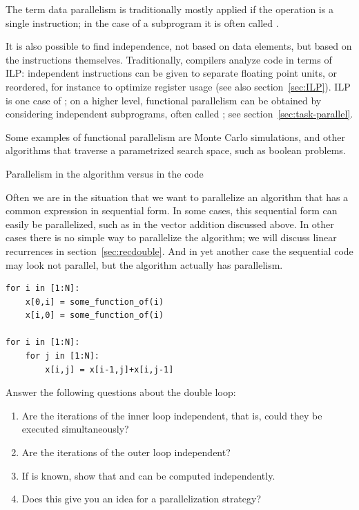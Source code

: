 The term data parallelism is traditionally mostly applied
if the operation is a single instruction; in the case of a subprogram
it is often called .

It is also possible to find independence, not based on data elements,
but based on the instructions themselves. Traditionally, compilers
analyze code in terms of \ac{ILP}: independent instructions can be given
to separate floating point units, or reordered, for instance to optimize
register usage (see also section~\ref{sec:ILP}).
\ac{ILP} is one case of ;
on a higher level, functional parallelism can be obtained
by considering independent subprograms, often called ;
see section~\ref{sec:task-parallel}.

Some examples of functional parallelism are Monte Carlo simulations,
and other algorithms that traverse a parametrized search space,
such as boolean  problems.

 {Parallelism in the algorithm versus in the code}

Often we are in the situation that we want to parallelize an algorithm
that has a common expression in sequential form. In some cases, this
sequential form can easily be parallelized, such as in the vector
addition discussed above. In other cases there is no simple way to
parallelize the algorithm; we will discuss linear recurrences in
section~\ref{sec:recdouble}. And in yet another case the sequential code may
look not parallel, but the algorithm actually has parallelism.

\begin{exercise}
\begin{verbatim}
for i in [1:N]:
    x[0,i] = some_function_of(i)
    x[i,0] = some_function_of(i)

for i in [1:N]:
    for j in [1:N]:
        x[i,j] = x[i-1,j]+x[i,j-1]
\end{verbatim}

Answer the following questions about the double  loop:
\begin{enumerate}
\item Are the iterations of the inner loop independent, that is, could
  they be executed simultaneously?
\item Are the iterations of the outer loop independent?
\item If  is known, show that  and  can
  be computed independently.
\item Does this give you an idea for a parallelization strategy?
\end{enumerate}
\end{exercise}

